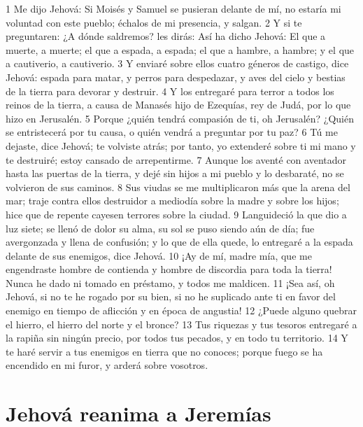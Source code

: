1 Me dijo Jehová: Si Moisés y Samuel se pusieran delante de mí, no estaría mi voluntad con este pueblo; échalos de mi presencia, y salgan.
2 Y si te preguntaren: ¿A dónde saldremos? les dirás: Así ha dicho Jehová: El que a muerte, a muerte; el que a espada, a espada; el que a hambre, a hambre; y el que a cautiverio, a cautiverio. 
3 Y enviaré sobre ellos cuatro géneros de castigo, dice Jehová: espada para matar, y perros para despedazar, y aves del cielo y bestias de la tierra para devorar y destruir. 
4 Y los entregaré para terror a todos los reinos de la tierra, a causa de Manasés hijo de Ezequías, rey de Judá, por lo que hizo en Jerusalén. 
5 Porque ¿quién tendrá compasión de ti, oh Jerusalén? ¿Quién se entristecerá por tu causa, o quién vendrá a preguntar por tu paz?
6 Tú me dejaste, dice Jehová; te volviste atrás; por tanto, yo extenderé sobre ti mi mano y te destruiré; estoy cansado de arrepentirme.
7 Aunque los aventé con aventador hasta las puertas de la tierra, y dejé sin hijos a mi pueblo y lo desbaraté, no se volvieron de sus caminos.
8 Sus viudas se me multiplicaron más que la arena del mar; traje contra ellos destruidor a mediodía sobre la madre y sobre los hijos; hice que de repente cayesen terrores sobre la ciudad.
9 Languideció la que dio a luz siete; se llenó de dolor su alma, su sol se puso siendo aún de día; fue avergonzada y llena de confusión; y lo que de ella quede, lo entregaré a la espada delante de sus enemigos, dice Jehová.
10 ¡Ay de mí, madre mía, que me engendraste hombre de contienda y hombre de discordia para toda la tierra! Nunca he dado ni tomado en préstamo, y todos me maldicen.
11 ¡Sea así, oh Jehová, si no te he rogado por su bien, si no he suplicado ante ti en favor del enemigo en tiempo de aflicción y en época de angustia!
12 ¿Puede alguno quebrar el hierro, el hierro del norte y el bronce?
13 Tus riquezas y tus tesoros entregaré a la rapiña sin ningún precio, por todos tus pecados, y en todo tu territorio.
14 Y te haré servir a tus enemigos en tierra que no conoces; porque fuego se ha encendido en mi furor, y arderá sobre vosotros.

\section*{Jehová reanima a Jeremías}

